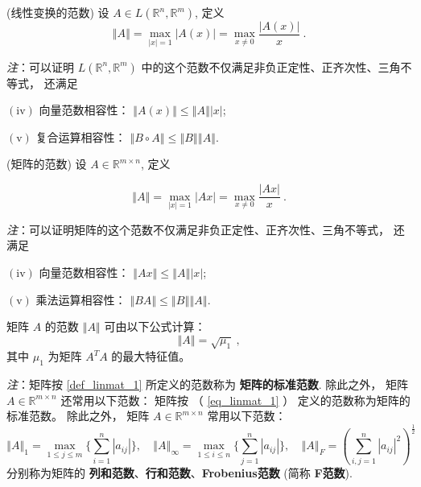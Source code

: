 \begin{definition}{(线性变换的范数)}
设 $A\in L(\mathbb{R}^{n},\mathbb{R}^{m})$, 定义
\[
\left\Vert A\right\Vert =\max_{|x|=1}|A(x)|=\max_{x\neq0}{\displaystyle \frac{|A(x)|}{x}}~.
\]
\end{definition}
\textsl{注}：可以证明 $L(\mathbb{R}^{n},\mathbb{R}^{m})$ 中的这个范数不仅满足非负正定性、正齐次性、三角不等式，
还满足

$(\mathrm{iv})$ 向量范数相容性： $\left\Vert A(x)\right\Vert \leqslant\left\Vert A\right\Vert \left|x\right|$;

$(\mathrm{v})$ 复合运算相容性： $\left\Vert B\circ A\right\Vert \leqslant\left\Vert B\right\Vert \left\Vert A\right\Vert $.



\begin{definition}{(矩阵的范数)}\label{def_linmat_1}
设 $A\in\mathbb{R}^{m\times n}$, 定义


\begin{equation}\label{eq_linmat_1}
\left\Vert A\right\Vert =\max_{|x|=1}|Ax|=\max_{x\neq0}{\displaystyle \frac{|Ax|}{x}}~.
\end{equation}


\end{definition}
\textsl{注}：可以证明矩阵的这个范数不仅满足非负正定性、正齐次性、三角不等式， 还满足

$(\mathrm{iv})$ 向量范数相容性： $\left\Vert Ax\right\Vert \leqslant\left\Vert A\right\Vert \left|x\right|$;

$(\mathrm{v})$ 乘法运算相容性： $\left\Vert BA\right\Vert \leqslant\left\Vert B\right\Vert \left\Vert A\right\Vert $.



\begin{theorem}{}
矩阵 $A$ 的范数 $\left\Vert A\right\Vert $ 可由以下公式计算： 
\[
\left\Vert A\right\Vert =\sqrt{\mu_{1}}~,
\]
 其中 $\mu_{1}$ 为矩阵 $A^{T}A$ 的最大特征值。 
\end{theorem}

\textsl{注}：矩阵按 \autoref{def_linmat_1} 所定义的范数称为 \textbf{矩阵的标准范数}. 除此之外， 矩阵 $A\in\mathbb{R}^{m\times n}$ 还常用以下范数：
矩阵按 （ \autoref{eq_linmat_1} ）  定义的范数称为矩阵的标准范数。 除此之外， 矩阵 $A\in\mathbb{R}^{m\times n}$ 常用以下范数：
\[
\left\Vert A\right\Vert _{1}=\max_{1\leqslant j\leqslant m}\{\sum_{i=1}^{n}|a_{ij}|\},\quad\left\Vert A\right\Vert _{\infty}=\max_{1\leqslant i\leqslant n}\{\sum_{j=1}^{n}|a_{ij}|\},\quad\left\Vert A\right\Vert _{F}=\left(\sum_{i,j=1}^{n}|a_{ij}|^{2}\right)^{\frac{1}{2}}~
\]
分别称为矩阵的 \textbf{列和范数}、\textbf{行和范数}、\textbf{Frobenius范数} (简称 \textbf{F范数}). 

